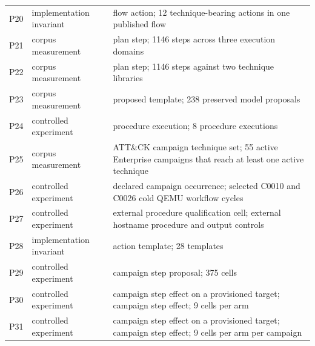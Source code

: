 \begin{tabularx}{\columnwidth}{@{}llL@{}}
P20 & implementation invariant & flow action; 12 technique-bearing actions in one published flow \\
P21 & corpus measurement & plan step; 1146 steps across three execution domains \\
P22 & corpus measurement & plan step; 1146 steps against two technique libraries \\
P23 & corpus measurement & proposed template; 238 preserved model proposals \\
P24 & controlled experiment & procedure execution; 8 procedure executions \\
P25 & corpus measurement & ATT\&CK campaign technique set; 55 active Enterprise campaigns that reach at least one active technique \\
P26 & controlled experiment & declared campaign occurrence; selected C0010 and C0026 cold QEMU workflow cycles \\
P27 & controlled experiment & external procedure qualification cell; external hostname procedure and output controls \\
P28 & implementation invariant & action template; 28 templates \\
P29 & controlled experiment & campaign step proposal; 375 cells \\
P30 & controlled experiment & campaign step effect on a provisioned target; campaign step effect; 9 cells per arm \\
P31 & controlled experiment & campaign step effect on a provisioned target; campaign step effect; 9 cells per arm per campaign \\
\bottomrule
\end{tabularx}
